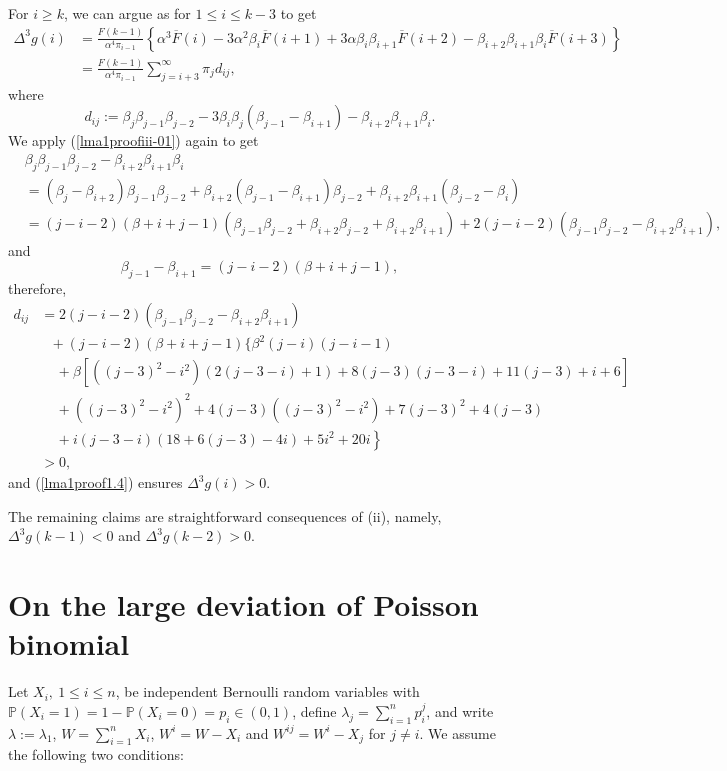 \documentclass[12pt]{article}
\newcommand{\Pro}{\mathbb{P}}
\newcommand{\prob}{\Pro}
\def\Ref#1{(\ref{#1})}
\newcommand{\oF}{{\overline{F}}}
\newcommand{\qed}{\nopagebreak\hspace*{\fill}
{\vrule width6pt height6ptdepth0pt}\par}
\newcounter{con}%
\numberwithin{equation}{section}
\begin{document}
For $i\ge k$, we can argue as for $1\le i\le k-3$ to get
\begin{align}\Delta^3 g(i)&=\frac{F(k-1)}{\alpha^4\pi_{i-1}}\left\{\alpha^3\oF(i)-3\alpha^2\beta_i\oF(i+1)+3\alpha\beta_i\beta_{i+1}\oF(i+2)-\beta_{i+2}\beta_{i+1}\beta_i\oF(i+3)\right\}\nonumber\\
 &=\frac{F(k-1)}{\alpha^4\pi_{i-1}}\sum_{j=i+3}^\infty\pi_jd_{ij},\label{lma1proof1.4}
 \end{align}
where 
$$d_{ij}:=\beta_j\beta_{j-1}\beta_{j-2}-3\beta_i\beta_j(\beta_{j-1}-\beta_{i+1})-\beta_{i+2}\beta_{i+1}\beta_i.$$
We apply \Ref{lma1proofiii-01} again to get 
 \begin{align*}
 &\beta_j\beta_{j-1}\beta_{j-2}-\beta_{i+2}\beta_{i+1}\beta_i\nonumber\\
 &=(\beta_j-\beta_{i+2})\beta_{j-1}\beta_{j-2}+\beta_{i+2}(\beta_{j-1}-\beta_{i+1})\beta_{j-2}+\beta_{i+2}\beta_{i+1}(\beta_{j-2}-\beta_i)\nonumber\\
 &=(j-i-2)(\beta+i+j-1)(\beta_{j-1}\beta_{j-2}+\beta_{i+2}\beta_{j-2}+\beta_{i+2}\beta_{i+1})+2(j-i-2)(\beta_{j-1}\beta_{j-2}-\beta_{i+2}\beta_{i+1}),
 \end{align*}
 and
 \[\beta_{j-1}-\beta_{i+1}=(j-i-2)(\beta+i+j-1),
\]
therefore,
\begin{align*}
d_{ij}&=2(j-i-2)(\beta_{j-1}\beta_{j-2}-\beta_{i+2}\beta_{i+1})\\
&\ \ \ +(j-i-2)(\beta+i+j-1)\{\beta^2(j-i)(j-i-1)\\
&\ \ \ \ \ +\beta\left[\left((j-3)^2-i^2\right)\left(2(j-3-i)+1\right)+8(j-3)(j-3-i)+11(j-3)+i+6\right]\\
&\ \ \ \ \ +\left((j-3)^2-i^2\right)^2+4(j-3)((j-3)^2-i^2)+7(j-3)^2+4(j-3)\\
&\ \ \ \ \ +\left.i(j-3-i)\left(18+6(j-3)-4i\right)+5i^2+20i\right\}\\
&>0,\end{align*}
and \Ref{lma1proof1.4} ensures $\Delta^3 g(i)>0$.

 The remaining claims are straightforward consequences of (ii), namely, $\Delta^3 g(k-1)<0$ and $\Delta^3 g(k-2)>0$. \qed
 
 \section{On the large deviation of Poisson binomial}%
 
 Let $X_i,\ 1\le i\le n$, be independent Bernoulli random variables with $\prob(X_i=1)=1-\prob(X_i=0)=p_i\in(0,1)$, define $\lambda_j=\sum_{i=1}^np_i^j$, and write $\lambda:=\lambda_1$, $W=\sum_{i=1}^nX_i$, $W^i=W-X_i$ and $W^{ij}=W^i-X_j$ for $j\ne i$. We assume the following two conditions:
 
\end{document}
